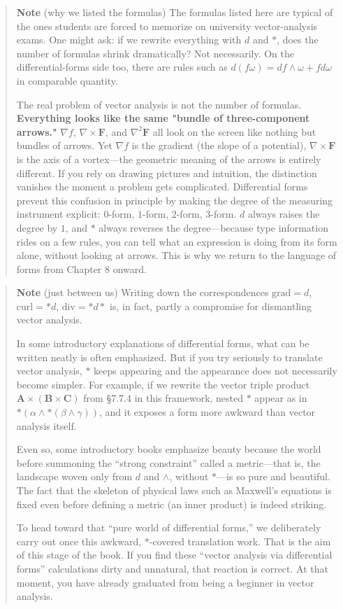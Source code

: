 \begin{quote}
\textbf{Note} (why we listed the formulas) The formulas listed here are
typical of the ones students are forced to memorize on university
vector-analysis exams. One might ask: if we rewrite everything with
\(d\) and \(\ast\), does the number of formulas shrink dramatically? Not
necessarily. On the differential-forms side too, there are rules such as
\(d(f\omega) = df\wedge\omega + f d\omega\) in comparable quantity.

The real problem of vector analysis is not the number of formulas.
\textbf{Everything looks like the same "bundle of three-component arrows."}
\(\nabla f\), \(\nabla \times \mathbf{F}\), and \(\nabla^2\mathbf{F}\)
all look on the screen like nothing but bundles of arrows. Yet
\(\nabla f\) is the gradient (the slope of a potential),
\(\nabla \times \mathbf{F}\) is the axis of a vortex---the geometric
meaning of the arrows is entirely different. If you rely on drawing
pictures and intuition, the distinction vanishes the moment a problem
gets complicated. Differential forms prevent this confusion in principle
by making the degree of the measuring instrument explicit: \(0\)-form,
\(1\)-form, \(2\)-form, \(3\)-form. \(d\) always raises the degree by
\(1\), and \(\ast\) always reverses the degree---because type
information rides on a few rules, you can tell what an expression is
doing from its form alone, without looking at arrows. This is why we
return to the language of forms from Chapter 8 onward.
\end{quote}

\begin{quote}
\textbf{Note} (just between us) Writing down the correspondences
\(\mathrm{grad}=d\), \(\mathrm{curl}=\ast d\),
\(\mathrm{div}=\ast d\ast\) is, in fact, partly a compromise for
dismantling vector analysis.

In some introductory explanations of differential forms, what can be
written neatly is often emphasized. But if you try seriously to
translate vector analysis, \(\ast\) keeps appearing and the appearance
does not necessarily become simpler. For example, if we rewrite the
vector triple product \(\mathbf{A}\times(\mathbf{B}\times\mathbf{C})\)
from §7.7.4 in this framework, nested \(\ast\) appear as in
\(\ast(\alpha \wedge \ast(\beta \wedge \gamma))\), and it exposes a form
more awkward than vector analysis itself.

Even so, some introductory books emphasize beauty because the world
before summoning the ``strong constraint'' called a metric---that is,
the landscape woven only from \(d\) and \(\wedge\), without
\(\ast\)---is so pure and beautiful. The fact that the skeleton of
physical laws such as Maxwell's equations is fixed even before defining
a metric (an inner product) is indeed striking.

To head toward that ``pure world of differential forms,'' we
deliberately carry out once this awkward, \(\ast\)-covered translation
work. That is the aim of this stage of the book. If you find these
``vector analysis via differential forms'' calculations dirty and
unnatural, that reaction is correct. At that moment, you have already
graduated from being a beginner in vector analysis.
\end{quote}

